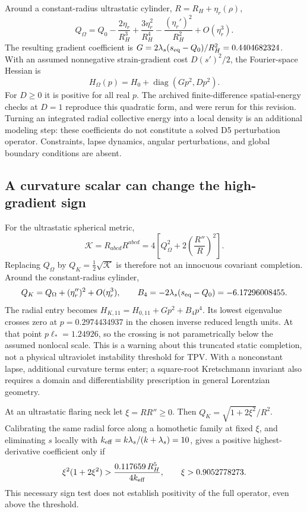 \documentclass[11pt,oneside]{report}
\newcommand{\diag}{\operatorname{diag}}
\begin{document}
Around a constant-radius ultrastatic cylinder, $R=R_H+\eta_r(\rho)$,
\begin{equation}
Q_\Omega=Q_0-\frac{2\eta_r}{R_H^3}
+\frac{3\eta_r^2}{R_H^4}-\frac{(\eta_r')^2}{R_H^2}+O(\eta_r^3).
\end{equation}
The resulting gradient coefficient is $G=2\lambda_s(s_{\rm eq}-Q_0)/R_H^2=0.4404682324$. With an assumed nonnegative strain-gradient cost $D(s')^2/2$, the Fourier-space Hessian is
\begin{equation}
H_\Omega(p)=H_0+\diag(Gp^2,Dp^2).
\end{equation}
For $D\ge0$ it is positive for all real $p$. The archived finite-difference spatial-energy checks at $D=1$ reproduce this quadratic form, and were rerun for this revision. Turning an integrated radial collective energy into a local density is an additional modeling step: these coefficients do not constitute a solved D5 perturbation operator. Constraints, lapse dynamics, angular perturbations, and global boundary conditions are absent.

\subsection{A curvature scalar can change the high-gradient sign}
For the ultrastatic spherical metric,
\begin{equation}
\mathcal K=R_{abcd}R^{abcd}
=4\left[Q_\Omega^2+2\left(\frac{R''}{R}\right)^2\right].
\end{equation}
Replacing $Q_\Omega$ by $Q_K=\tfrac12\sqrt{\mathcal K}$ is therefore not an innocuous covariant completion. Around the constant-radius cylinder,
\begin{equation}
Q_K=Q_\Omega+(\eta_r'')^2+O(\eta_r^3),\qquad
B_4=-2\lambda_s(s_{\rm eq}-Q_0)=-6.17296008455.
\end{equation}
The radial entry becomes $H_{K,11}=H_{0,11}+Gp^2+B_4p^4$. Its lowest eigenvalue crosses zero at $p=0.2974434937$ in the chosen inverse reduced length units. At that point $p\ell_*=1.24926$, so the crossing is not parametrically below the assumed nonlocal scale. This is a warning about this truncated static completion, not a physical ultraviolet instability threshold for TPV. With a nonconstant lapse, additional curvature terms enter; a square-root Kretschmann invariant also requires a domain and differentiability prescription in general Lorentzian geometry.

At an ultrastatic flaring neck let $\xi=RR''\ge0$. Then $Q_K=\sqrt{1+2\xi^2}/R^2$. Calibrating the same radial force along a homothetic family at fixed $\xi$, and eliminating $s$ locally with $k_{\rm eff}=k\lambda_s/(k+\lambda_s)=10$, gives a positive highest-derivative coefficient only if
\begin{equation}
\xi^2(1+2\xi^2)>\frac{0.117659\,R_H^5}{4k_{\rm eff}},
\qquad \xi>0.9052778273.
\end{equation}
This necessary sign test does not establish positivity of the full operator, even above the threshold.
\end{document}
